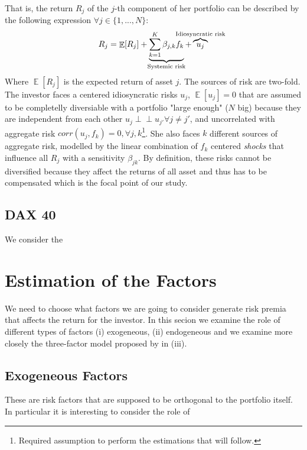 \documentclass[hidelinks,12pts]{article}
\DeclareMathOperator{\E}{\mathbb{E}}
\DeclareMathOperator{\1}{\mathbbm{1}}
\newcommand{\ind}{\perp\!\!\!\!\perp}
\begin{document}
That is, the return $R_j$ of the $j$-th component of her portfolio can be described by the following expression $\forall j\in \{1,...,N\}$: 
    \begin{equation} \label{eq:factorialmodel}
        R_j = \E[R_j] + \underbrace{\sum_{k=1}^K \beta_{j,k} f_k}_{\mathclap{\text{Systemic risk}}} + \overbrace{u_j}^{\mathclap{\text{Idiosyncratic risk}}}
    \end{equation}
Where $\E[R_j]$ is the expected return of asset $j$. 
The sources of risk are two-fold. 
The investor faces a centered idiosyncratic risks $u_j$, $\E[u_j]=0$ that are assumed to be completelly diversiable with a portfolio "large enough" ($N$ big) because they are independent from each other $u_j \ind u_{j'} \forall j\neq j' $, and uncorrelated with aggregate risk $corr(u_j, f_k) = 0, \forall j, k$\footnote{Required assumption to perform the estimations that will follow.}.
She also faces $k$ different sources of aggregate risk, modelled by the linear combination of $f_k$ centered \emph{shocks} that influence all $R_j$ with a sensitivity $\beta_{jk}$. 
By definition, these risks cannot be diversified because they affect the returns of all asset and thus has to be compensated which is the focal point of our study. 



    \subsection{DAX 40}
We consider the 


\section{Estimation of the Factors}

We need to choose what factors we are going to consider generate risk premia that affects the return for the investor. In this secion we examine the role of different types of factors (i) exogeneous, (ii) endogeneous and we examine more closely the three-factor model proposed by \cite{famaCommonRiskFactors1993} in (iii).



    \subsection{Exogeneous Factors}
These are risk factors that are supposed to be orthogonal to the portfolio itself. 
In particular it is interesting to consider the role of 
\end{document}
